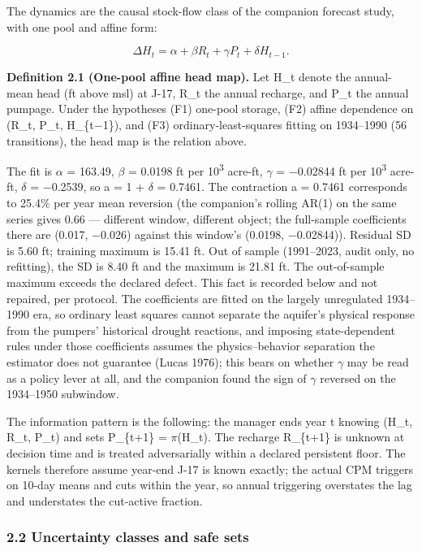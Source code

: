 The dynamics are the causal stock-flow class of the companion forecast
study, with one pool and affine form:

\[\Delta H_t = \alpha + \beta R_t + \gamma P_t + \delta H_{t-1}.\]

\textbf{Definition 2.1 (One-pool affine head map).} Let H\_t denote the
annual-mean head (ft above msl) at J-17, R\_t the annual recharge, and
P\_t the annual pumpage. Under the hypotheses (F1) one-pool storage,
(F2) affine dependence on (R\_t, P\_t, H\_\{t\ensuremath{-}1\}), and (F3)
ordinary-least-squares fitting on 1934--1990 (56 transitions), the head
map is the relation above.

The fit is \ensuremath{\alpha} = 163.49, \ensuremath{\beta} = 0.0198 ft per 10\textsuperscript{3} acre-ft, \ensuremath{\gamma} = \ensuremath{-}0.02844 ft
per 10\textsuperscript{3} acre-ft, \ensuremath{\delta} = \ensuremath{-}0.2539, so a = 1 + \ensuremath{\delta} = 0.7461. The contraction a =
0.7461 corresponds to 25.4\% per year mean reversion (the companion's
rolling AR(1) on the same series gives 0.66 --- different window,
different object; the full-sample coefficients there are (0.017, \ensuremath{-}0.026)
against this window's (0.0198, \ensuremath{-}0.02844)). Residual SD is 5.60 ft;
training maximum is 15.41 ft. Out of sample (1991--2023, audit only, no
refitting), the SD is 8.40 ft and the maximum is 21.81 ft. The
out-of-sample maximum exceeds the declared defect. This fact is recorded
below and not repaired, per protocol. The coefficients are fitted on the
largely unregulated 1934--1990 era, so ordinary least squares cannot
separate the aquifer's physical response from the pumpers' historical
drought reactions, and imposing state-dependent rules under those
coefficients assumes the physics--behavior separation the estimator does
not guarantee (Lucas 1976); this bears on whether \ensuremath{\gamma} may be read as a
policy lever at all, and the companion found the sign of \ensuremath{\gamma} reversed on
the 1934--1950 subwindow.

The information pattern is the following: the manager ends year t
knowing (H\_t, R\_t, P\_t) and sets P\_\{t+1\} = \ensuremath{\pi}(H\_t). The recharge
R\_\{t+1\} is unknown at decision time and is treated adversarially
within a declared persistent floor. The kernels therefore assume
year-end J-17 is known exactly; the actual CPM triggers on 10-day means
and cuts within the year, so annual triggering overstates the lag and
understates the cut-active fraction.

\subsubsection{2.2 Uncertainty classes and safe
sets}\label{edw-uncertainty-classes-and-safe-sets}

